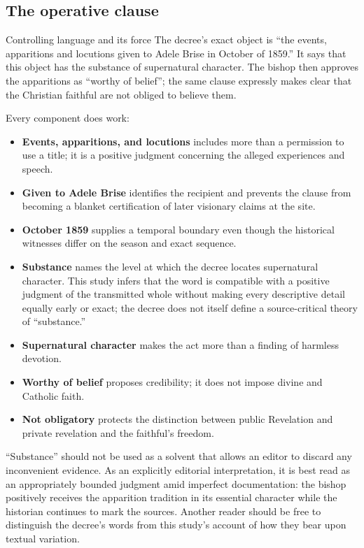 \subsection{The operative clause}

\begin{studybox}{Controlling language and its force}
The decree's exact object is “the events, apparitions and locutions given to Adele Brise in October of 1859.” It says that this object has the substance of supernatural character. The bishop then approves the apparitions as “worthy of belief”; the same clause expressly makes clear that the Christian faithful are not obliged to believe them.
\end{studybox}

Every component does work:

\begin{itemize}
  \item \textbf{Events, apparitions, and locutions} includes more than a permission to use a title; it is a positive judgment concerning the alleged experiences and speech.
  \item \textbf{Given to Adele Brise} identifies the recipient and prevents the clause from becoming a blanket certification of later visionary claims at the site.
  \item \textbf{October 1859} supplies a temporal boundary even though the historical witnesses differ on the season and exact sequence.
  \item \textbf{Substance} names the level at which the decree locates supernatural character. This study infers that the word is compatible with a positive judgment of the transmitted whole without making every descriptive detail equally early or exact; the decree does not itself define a source-critical theory of “substance.”
  \item \textbf{Supernatural character} makes the act more than a finding of harmless devotion.
  \item \textbf{Worthy of belief} proposes credibility; it does not impose divine and Catholic faith.
  \item \textbf{Not obligatory} protects the distinction between public Revelation and private revelation and the faithful's freedom.
\end{itemize}

“Substance” should not be used as a solvent that allows an editor to discard any inconvenient evidence. As an explicitly editorial interpretation, it is best read as an appropriately bounded judgment amid imperfect documentation: the bishop positively receives the apparition tradition in its essential character while the historian continues to mark the sources. Another reader should be free to distinguish the decree's words from this study's account of how they bear upon textual variation.

